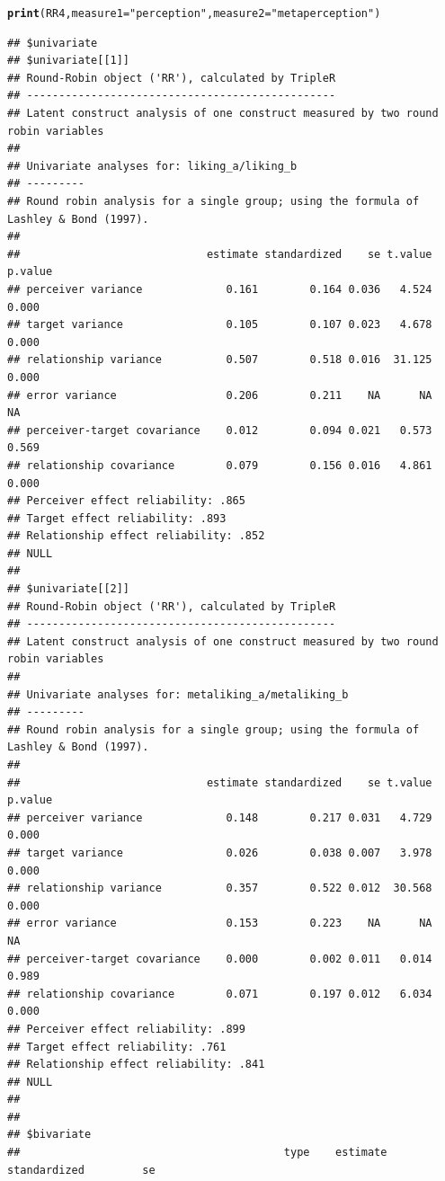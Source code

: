 \documentclass[a4paper]{article}\usepackage[]{graphicx}\usepackage[]{color}
\makeatletter
\newcommand{\hlstr}[1]{\textcolor[rgb]{0.192,0.494,0.8}{#1}}%
\newcommand{\hlstd}[1]{\textcolor[rgb]{0.345,0.345,0.345}{#1}}%
\newcommand{\hlkwc}[1]{\textcolor[rgb]{0.333,0.667,0.333}{#1}}%
\newcommand{\hlkwd}[1]{\textcolor[rgb]{0.737,0.353,0.396}{\textbf{#1}}}%
\newenvironment{kframe}{%
 \def\at@end@of@kframe{}%
 \ifinner\ifhmode%
  \def\at@end@of@kframe{\end{minipage}}%
  \begin{minipage}{\columnwidth}%
 \fi\fi%
 \def\FrameCommand##1{\hskip\@totalleftmargin \hskip-\fboxsep
 \colorbox{shadecolor}{##1}\hskip-\fboxsep
     \hskip-\linewidth \hskip-\@totalleftmargin \hskip\columnwidth}%
 \MakeFramed {\advance\hsize-\width
   \@totalleftmargin\z@ \linewidth\hsize
   \@setminipage}}%
 {\par\unskip\endMakeFramed%
 \at@end@of@kframe}
\newenvironment{knitrout}{}{} %
\makeatother
\begin{document}
\begin{knitrout}\small
{}\color{fgcolor}\begin{kframe}
\begin{alltt}
\hlkwd{print}\hlstd{(RR4,} \hlkwc{measure1} \hlstd{=} \hlstr{"perception"}\hlstd{,} \hlkwc{measure2} \hlstd{=} \hlstr{"metaperception"}\hlstd{)}
\end{alltt}
\begin{verbatim}
## $univariate
## $univariate[[1]]
## Round-Robin object ('RR'), calculated by TripleR
## ------------------------------------------------
## Latent construct analysis of one construct measured by two round robin variables
## 
## Univariate analyses for: liking_a/liking_b 
## ---------
## Round robin analysis for a single group; using the formula of Lashley & Bond (1997).
## 
##                             estimate standardized    se t.value p.value
## perceiver variance             0.161        0.164 0.036   4.524   0.000
## target variance                0.105        0.107 0.023   4.678   0.000
## relationship variance          0.507        0.518 0.016  31.125   0.000
## error variance                 0.206        0.211    NA      NA      NA
## perceiver-target covariance    0.012        0.094 0.021   0.573   0.569
## relationship covariance        0.079        0.156 0.016   4.861   0.000
## Perceiver effect reliability: .865 
## Target effect reliability: .893 
## Relationship effect reliability: .852 
## NULL
## 
## $univariate[[2]]
## Round-Robin object ('RR'), calculated by TripleR
## ------------------------------------------------
## Latent construct analysis of one construct measured by two round robin variables
## 
## Univariate analyses for: metaliking_a/metaliking_b 
## ---------
## Round robin analysis for a single group; using the formula of Lashley & Bond (1997).
## 
##                             estimate standardized    se t.value p.value
## perceiver variance             0.148        0.217 0.031   4.729   0.000
## target variance                0.026        0.038 0.007   3.978   0.000
## relationship variance          0.357        0.522 0.012  30.568   0.000
## error variance                 0.153        0.223    NA      NA      NA
## perceiver-target covariance    0.000        0.002 0.011   0.014   0.989
## relationship covariance        0.071        0.197 0.012   6.034   0.000
## Perceiver effect reliability: .899 
## Target effect reliability: .761 
## Relationship effect reliability: .841 
## NULL
## 
## 
## $bivariate
##                                         type    estimate standardized         se

\end{verbatim}
\end{kframe}
\end{knitrout}
\end{document}
